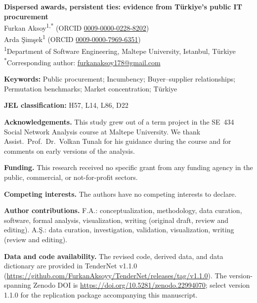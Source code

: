\documentclass[11pt,a4paper]{article}
\begin{document}
\begin{center}
{\Large\bfseries Dispersed awards, persistent ties: evidence from Türkiye's public IT procurement}\\[1.5em]
Furkan Aksoy\textsuperscript{1,*} (ORCID \href{https://orcid.org/0009-0000-0228-8202}{0009-0000-0228-8202})\\
Arda Şimşek\textsuperscript{1} (ORCID \href{https://orcid.org/0009-0000-7969-6351}{0009-0000-7969-6351})\\[1em]
\textsuperscript{1}Department of Software Engineering, Maltepe University, Istanbul, Türkiye\\[0.5em]
\textsuperscript{*}Corresponding author: \href{mailto:furkanaksoy178@gmail.com}{furkanaksoy178@gmail.com}
\end{center}

\bigskip
{\raggedright\noindent\textbf{Keywords:} Public procurement; Incumbency; Buyer--supplier relationships; Permutation benchmarks; Market concentration; Türkiye\par}

\noindent\textbf{JEL classification:} H57, L14, L86, D22

\bigskip
\noindent\textbf{Acknowledgements.} This study grew out of a term project in the SE~434 Social Network Analysis course at Maltepe University. We thank Assist.\ Prof.\ Dr.\ Volkan Tunal\i{} for his guidance during the course and for comments on early versions of the analysis.

\medskip
\noindent\textbf{Funding.} This research received no specific grant from any funding agency in the public, commercial, or not-for-profit sectors.

\medskip
\noindent\textbf{Competing interests.} The authors have no competing interests to declare.

\medskip
\noindent\textbf{Author contributions.} F.A.: conceptualization, methodology, data curation, software, formal analysis, visualization, writing (original draft, review and editing). A.Ş.: data curation, investigation, validation, visualization, writing (review and editing).

\medskip
\noindent\textbf{Data and code availability.} The revised code, derived data, and data dictionary are provided in TenderNet v1.1.0 (\url{https://github.com/FurkanAksoyy/TenderNet/releases/tag/v1.1.0}). The version-spanning Zenodo DOI is \url{https://doi.org/10.5281/zenodo.22994070}; select version 1.1.0 for the replication package accompanying this manuscript.
\end{document}
